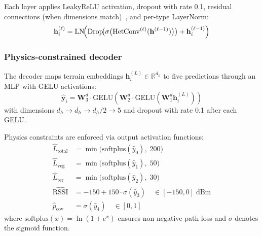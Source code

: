 \documentclass{ieeeaccess}
\begin{document}
Each layer applies LeakyReLU activation, dropout with rate 0.1, residual connections (when dimensions match)~\cite{he2016deep}, and per-type LayerNorm:
\begin{equation}
\mathbf{h}_i^{(\ell)} = \mathrm{LN}\!\Bigl(\mathrm{Drop}\!\bigl(\sigma\bigl(\mathrm{HetConv}^{(\ell)}(\mathbf{h}^{(\ell-1)})\bigr)\bigr) + \mathbf{h}_i^{(\ell-1)}\Bigr)
\label{eq:gnn_layer}
\end{equation}

\subsubsection{Physics-constrained decoder}

The decoder maps terrain embeddings $\mathbf{h}_i^{(L)} \in \mathbb{R}^{d_h}$ to five predictions through an MLP with GELU activations:
\begin{equation}
\hat{\mathbf{y}}_i = \mathbf{W}_3^d \cdot \mathrm{GELU}(\mathbf{W}_2^d \cdot \mathrm{GELU}(\mathbf{W}_1^d \mathbf{h}_i^{(L)}))
\label{eq:decoder}
\end{equation}
with dimensions $d_h \to d_h \to d_h/2 \to 5$ and dropout with rate 0.1 after each GELU.

Physics constraints are enforced via output activation functions:
\begin{align}
\hat{L}_{\text{total}} &= \min\!\bigl(\mathrm{softplus}(\hat{y}_0),\; 200\bigr) \label{eq:constraint_pl} \\
\hat{L}_{\text{veg}} &= \min\!\bigl(\mathrm{softplus}(\hat{y}_1),\; 50\bigr) \\
\hat{L}_{\text{ter}} &= \min\!\bigl(\mathrm{softplus}(\hat{y}_2),\; 30\bigr) \\
\widehat{\text{RSSI}} &= -150 + 150 \cdot \sigma(\hat{y}_3) \quad \in [-150, 0]\;\text{dBm} \\
\hat{p}_{\text{cov}} &= \sigma(\hat{y}_4) \quad \in [0, 1] \label{eq:constraint_cov}
\end{align}
where $\mathrm{softplus}(x) = \ln(1 + e^x)$ ensures non-negative path loss and $\sigma$ denotes the sigmoid function.
\end{document}
